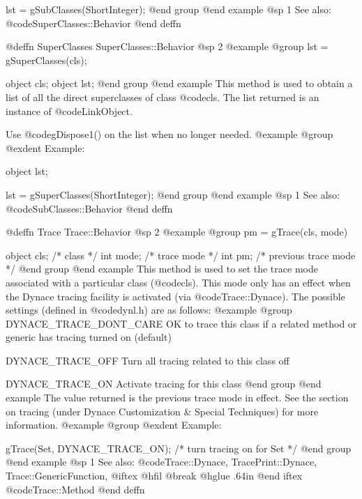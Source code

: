 lst = gSubClasses(ShortInteger);
@end group
@end example
@sp 1
See also:  @code{SuperClasses::Behavior}
@end deffn









@deffn {SuperClasses} SuperClasses::Behavior
@sp 2
@example
@group
lst = gSuperClasses(cls);

object  cls;
object  lst;
@end group
@end example
This method is used to obtain a list of all the direct superclasses of
class @code{cls}.  The list returned is an instance of
@code{LinkObject}.

Use @code{gDispose1()} on the list when no longer needed.
@example
@group
@exdent Example:

object  lst;

lst = gSuperClasses(ShortInteger);
@end group
@end example
@sp 1
See also:  @code{SubClasses::Behavior}
@end deffn











@deffn {Trace} Trace::Behavior
@sp 2
@example
@group
pm = gTrace(cls, mode)

object  cls;    /*  class                */
int     mode;   /*  trace mode           */
int     pm;     /*  previous trace mode  */
@end group
@end example
This method is used to set the trace mode associated with a
particular class (@code{cls}).  This mode only has an effect when
the Dynace tracing facility is activated (via @code{Trace::Dynace}).
The possible settings (defined in @code{dynl.h}) are as follows:
@example
@group
DYNACE_TRACE_DONT_CARE   OK to trace this class if a related
                         method or generic has tracing turned
                         on (default)

DYNACE_TRACE_OFF         Turn all tracing related to this
                         class off

DYNACE_TRACE_ON          Activate tracing for this class
@end group
@end example
The value returned is the previous trace mode in effect.  See the
section on tracing (under Dynace Customization & Special Techniques) for
more information.
@example
@group
@exdent Example:

gTrace(Set, DYNACE_TRACE_ON); /* turn tracing on for Set */
@end group
@end example
@sp 1
See also:  @code{Trace::Dynace, TracePrint::Dynace, Trace::GenericFunction,}
@iftex
@hfil @break @hglue .64in 
@end iftex
@code{Trace::Method}
@end deffn










